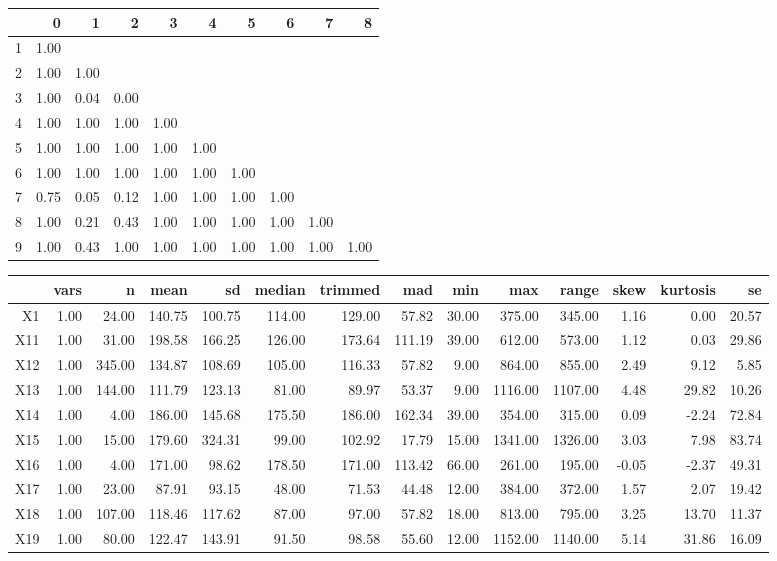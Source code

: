 % 
\begin{tabular}{rrrrrrrrrr}
  \hline
 & 0 & 1 & 2 & 3 & 4 & 5 & 6 & 7 & 8 \\ 
  \hline
1 & 1.00 &  &  &  &  &  &  &  &  \\ 
  2 & 1.00 & 1.00 &  &  &  &  &  &  &  \\ 
  3 & 1.00 & 0.04 & 0.00 &  &  &  &  &  &  \\ 
  4 & 1.00 & 1.00 & 1.00 & 1.00 &  &  &  &  &  \\ 
  5 & 1.00 & 1.00 & 1.00 & 1.00 & 1.00 &  &  &  &  \\ 
  6 & 1.00 & 1.00 & 1.00 & 1.00 & 1.00 & 1.00 &  &  &  \\ 
  7 & 0.75 & 0.05 & 0.12 & 1.00 & 1.00 & 1.00 & 1.00 &  &  \\ 
  8 & 1.00 & 0.21 & 0.43 & 1.00 & 1.00 & 1.00 & 1.00 & 1.00 &  \\ 
  9 & 1.00 & 0.43 & 1.00 & 1.00 & 1.00 & 1.00 & 1.00 & 1.00 & 1.00 \\ 
   \hline
\end{tabular}
% 
\begin{tabular}{rrrrrrrrrrrrrr}
  \hline
 & vars & n & mean & sd & median & trimmed & mad & min & max & range & skew & kurtosis & se \\ 
  \hline
X1 & 1.00 & 24.00 & 140.75 & 100.75 & 114.00 & 129.00 & 57.82 & 30.00 & 375.00 & 345.00 & 1.16 & 0.00 & 20.57 \\ 
  X11 & 1.00 & 31.00 & 198.58 & 166.25 & 126.00 & 173.64 & 111.19 & 39.00 & 612.00 & 573.00 & 1.12 & 0.03 & 29.86 \\ 
  X12 & 1.00 & 345.00 & 134.87 & 108.69 & 105.00 & 116.33 & 57.82 & 9.00 & 864.00 & 855.00 & 2.49 & 9.12 & 5.85 \\ 
  X13 & 1.00 & 144.00 & 111.79 & 123.13 & 81.00 & 89.97 & 53.37 & 9.00 & 1116.00 & 1107.00 & 4.48 & 29.82 & 10.26 \\ 
  X14 & 1.00 & 4.00 & 186.00 & 145.68 & 175.50 & 186.00 & 162.34 & 39.00 & 354.00 & 315.00 & 0.09 & -2.24 & 72.84 \\ 
  X15 & 1.00 & 15.00 & 179.60 & 324.31 & 99.00 & 102.92 & 17.79 & 15.00 & 1341.00 & 1326.00 & 3.03 & 7.98 & 83.74 \\ 
  X16 & 1.00 & 4.00 & 171.00 & 98.62 & 178.50 & 171.00 & 113.42 & 66.00 & 261.00 & 195.00 & -0.05 & -2.37 & 49.31 \\ 
  X17 & 1.00 & 23.00 & 87.91 & 93.15 & 48.00 & 71.53 & 44.48 & 12.00 & 384.00 & 372.00 & 1.57 & 2.07 & 19.42 \\ 
  X18 & 1.00 & 107.00 & 118.46 & 117.62 & 87.00 & 97.00 & 57.82 & 18.00 & 813.00 & 795.00 & 3.25 & 13.70 & 11.37 \\ 
  X19 & 1.00 & 80.00 & 122.47 & 143.91 & 91.50 & 98.58 & 55.60 & 12.00 & 1152.00 & 1140.00 & 5.14 & 31.86 & 16.09 \\ 
   \hline
\end{tabular}
